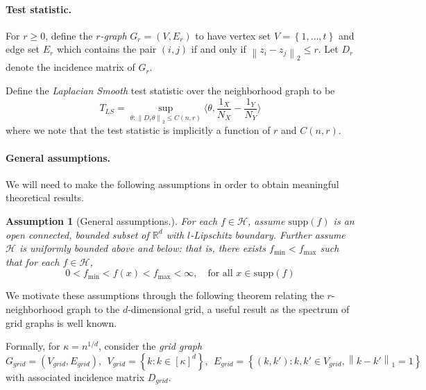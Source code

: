 \documentclass{article}
\newcommand{\Reals}{\mathbb{R}}
\newcommand{\norm}[1]{\left\lVert#1\right\rVert}
\newcommand{\set}[1]{\left\{#1\right\}}
\newcommand{\dotp}[2]{\langle #1, #2 \rangle}
\newcommand{\1}{\mathbb{I}}
\newcommand{\Rd}{\Reals^d}
\theoremstyle{alden}
\theoremstyle{aldenthm}
\newtheorem{assumption}{Assumption}
\theoremstyle{definition}
\theoremstyle{remark}
\begin{document}
\paragraph{Test statistic.}

For $r \geq 0$, define the \emph{$r$-graph} $G_r = (V,E_r)$ to have vertex set $V = \set{1,\ldots,t}$ and edge set $E_r$ which contains the pair $(i,j)$ if and only if $\norm{z_i - z_j}_2 \leq r$. Let $D_{r}$ denote the incidence matrix of $G_r$.

Define the \emph{Laplacian Smooth} test statistic over the neighborhood graph to be
\begin{equation*}
T_{LS} = \sup_{\theta: \norm{D_{r}\theta}_2 \leq C(n,r)} \dotp{\theta }{\frac{1_X}{N_X} - \frac{1_Y}{N_Y}}
\end{equation*}
where we note that the test statistic is implicitly a function of $r$ and $C(n,r)$. 

\paragraph{General assumptions.}
We will need to make the following assumptions in order to obtain meaningful theoretical results.

\begin{assumption}[General assumptions.]
	\label{asmp: general}
	For each $f \in \mathcal{H}$, assume $\mathrm{supp}(f)$ is an open connected, bounded subset of $\Rd$ with $l$-Lipschitz boundary. Further assume $\mathcal{H}$ is uniformly bounded above and below: that is, there exists $f_{\min} < f_{\max}$ such that for each $f \in \mathcal{H}$, 
	\begin{equation*}
	0 < f_{\min} < f(x) < f_{\max} < \infty, \quad \textrm{for all $x \in \mathrm{supp}(f)$}
	\end{equation*}
\end{assumption}

We motivate these assumptions through the following theorem relating the $r$-neighborhood graph to the $d$-dimensional grid, a useful result as the spectrum of grid graphs is well known.

Formally, for $\kappa = n^{1/d}$, consider the \emph{grid graph}
\begin{equation*}
G_{grid} = (V_{grid},E_{grid}),~~ V_{grid} = \set{k: k \in [\kappa]^d},~~ E_{grid} = \set{(k,k'): k, k' \in V_{grid}, \norm{k - k'}_1 = 1}
\end{equation*}
with associated incidence matrix $D_{grid}$.
\end{document}
